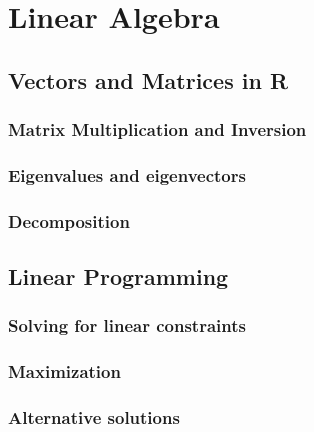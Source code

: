 \section{Linear Algebra}
\subsection{Vectors and Matrices in R}
\subsubsection{Matrix Multiplication and Inversion}
\subsubsection{Eigenvalues and eigenvectors}
\subsubsection{Decomposition}
\subsection{Linear Programming}
\subsubsection{Solving for linear constraints}
\subsubsection{Maximization}
\subsubsection{Alternative solutions}
\endinput
